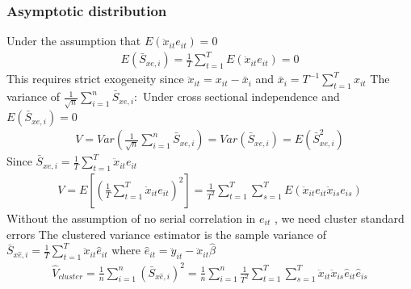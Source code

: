 \documentclass[a4paper,twoside,11pt]{article}
\begin{document}
\subsubsection{Asymptotic distribution}
Under the assumption that $E(\ddot x_{it} e_{it})=0$
\begin{equation*}
\begin{aligned}
E(\bar S_{xe,i}) = \frac{1}{T} \sum^T_{t=1} E(\ddot x_{it} e_{it} ) = 0
\end{aligned} 
\end{equation*}
This requires strict exogeneity since $\ddot x_{it} = x_{it} - \bar x_i$ and $\bar x_i = T^{-1} \sum^T_{t=1} x_{it}$
\newline
\newline
The variance of $\frac{1}{\sqrt{n}} \sum^n_{i=1} \bar S_{xe,i}: $
\newline
\newline
Under cross sectional independence and $E(\bar S_{xe,i}) = 0$
\begin{equation*}
\begin{aligned}
V = Var(\frac{1}{\sqrt{n}} \sum^n_{i=1} \bar S_{xe,i}) = Var(\bar S_{xe,i}) = E(\bar S_{xe,i}^2)
\end{aligned} 
\end{equation*}
Since $\bar S_{xe,i} = \frac{1}{T} \sum^T_{t=1} \ddot x_{it} e_{it}$
\begin{equation*}
\begin{aligned}
V = E[(\frac{1}{T} \sum^T_{t=1} \ddot x_{it} e_{it} )^2] = \frac{1}{T^2} \sum^T_{t=1} \sum^T_{s=1} E(\ddot x_{it}  e_{it}  \ddot x_{is} e_{is})
\end{aligned} 
\end{equation*}
\textcolor{NavyBlue}{Without the assumption of no serial correlation in $e_{it}$ , we need cluster standard errors}
\newline
\newline
The clustered variance estimator is the sample variance of $\bar S_{x \hat{e},i} = \frac{1}{T} \sum^T_{t=1} \ddot x_{it} \hat{e}_{it}$ where $\hat{e}_{it} = \ddot y_{it} - \ddot x_{it} \hat{\beta}$
\begin{equation*}
\begin{aligned}
\hat{V}_{cluster} = \frac{1}{n} \sum^n_{i=1} (\bar S_{x\hat{e},i})^2 = \frac{1}{n} \sum^n_{i=1} \frac{1}{T^2} \sum^T_{t=1} \sum^T_{s=1} \ddot x_{it} \ddot x_{is} \hat{e}_{it} \hat{e}_{is}
\end{aligned} 
\end{equation*}
\end{document}
